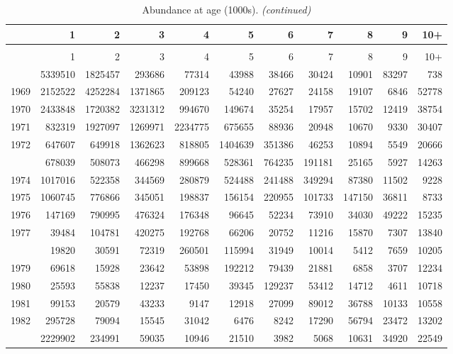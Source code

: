 \documentclass[
]{article}
\begin{document}
\begin{longtable}[t]{lrrrrrrrrrr}
\caption{\label{tab:NAA-table}Abundance at age (1000s).}\\
\toprule
  & 1 & 2 & 3 & 4 & 5 & 6 & 7 & 8 & 9 & 10+\\
\midrule
\endfirsthead
\caption[]{Abundance at age (1000s). \textit{(continued)}}\\
\toprule
  & 1 & 2 & 3 & 4 & 5 & 6 & 7 & 8 & 9 & 10+\\
\midrule
\endhead

\endfoot
\bottomrule
\endlastfoot
1968 & 5339510 & 1825457 & 293686 & 77314 & 43988 & 38466 & 30424 & 10901 & 83297 & 738\\
1969 & 2152522 & 4252284 & 1371865 & 209123 & 54240 & 27627 & 24158 & 19107 & 6846 & 52778\\
1970 & 2433848 & 1720382 & 3231312 & 994670 & 149674 & 35254 & 17957 & 15702 & 12419 & 38754\\
1971 & 832319 & 1927097 & 1269971 & 2234775 & 675655 & 88936 & 20948 & 10670 & 9330 & 30407\\
1972 & 647607 & 649918 & 1362623 & 818805 & 1404639 & 351386 & 46253 & 10894 & 5549 & 20666\\
\addlinespace
1973 & 678039 & 508073 & 466298 & 899668 & 528361 & 764235 & 191181 & 25165 & 5927 & 14263\\
1974 & 1017016 & 522358 & 344569 & 280879 & 524488 & 241488 & 349294 & 87380 & 11502 & 9228\\
1975 & 1060745 & 776866 & 345051 & 198837 & 156154 & 220955 & 101733 & 147150 & 36811 & 8733\\
1976 & 147169 & 790995 & 476324 & 176348 & 96645 & 52234 & 73910 & 34030 & 49222 & 15235\\
1977 & 39484 & 104781 & 420275 & 192768 & 66206 & 20752 & 11216 & 15870 & 7307 & 13840\\
\addlinespace
1978 & 19820 & 30591 & 72319 & 260501 & 115994 & 31949 & 10014 & 5412 & 7659 & 10205\\
1979 & 69618 & 15928 & 23642 & 53898 & 192212 & 79439 & 21881 & 6858 & 3707 & 12234\\
1980 & 25593 & 55838 & 12237 & 17450 & 39345 & 129237 & 53412 & 14712 & 4611 & 10718\\
1981 & 99153 & 20579 & 43233 & 9147 & 12918 & 27099 & 89012 & 36788 & 10133 & 10558\\
1982 & 295728 & 79094 & 15545 & 31042 & 6476 & 8242 & 17290 & 56794 & 23472 & 13202\\
\addlinespace
1983 & 2229902 & 234991 & 59035 & 10946 & 21510 & 3982 & 5068 & 10631 & 34920 & 22549\\

\end{longtable}
\end{document}
